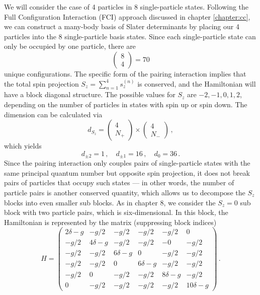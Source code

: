 {We will consider the case of 4 particles in 8 single-particle states. Following
the Full Configuration Interaction (FCI) approach discussed in chapter \ref{chapter:cc},
we can construct a many-body basis of Slater determinants by placing
our 4 particles into the 8 single-particle basis states. Since each
single-particle state can only be occupied by one particle, there are
\begin{equation}
  \begin{pmatrix} 8 \\ 4\end{pmatrix} = 70
\end{equation}
unique configurations. The specific form of the pairing interaction
implies that the total spin projection $S_z = \sum_{n=1}^4 s_z^{(n)}$ 
is conserved, and the Hamiltonian will have a block diagonal structure.
The possible values for $S_z$ are $-2,-1,0,1,2$, depending on the number
of particles in states with spin up or spin down. The dimension can be
calculated via
\begin{equation}
 d_{S_z} = \begin{pmatrix} 4 \\ N_{+}\end{pmatrix} \times 
           \begin{pmatrix} 4 \\ N_{-}\end{pmatrix}\,,
\end{equation}
which yields 
\begin{equation}
 d_{\pm 2} = 1\,, \quad d_{\pm 1} = 16\,, \quad d_{0} = 36\,.
\end{equation}
Since the pairing interaction only couples pairs of single-particle 
states with the same principal quantum number but opposite spin
projection, it does not break pairs of particles that occupy such 
states --- in other words, the number of particle pairs is another
conserved quantity, which allows us to decompose the $S_z$ blocks
into even smaller sub blocks. As in chapter 8, we consider the $S_z=0$
sub block with two particle pairs, which is six-dimensional. In this
block, the Hamiltonian is represented by the matrix (suppressing
block indices)
\begin{equation}\label{eq:def_h_matrix}
  H = \begin{pmatrix}
  2\delta -g  &      -g/2  &       -g/2 &      -g/2 &      -g/2 &        0 \\ 
         -g/2 & 4\delta -g &       -g/2 &      -g/2 &        -0 &     -g/2 \\ 
         -g/2 &       -g/2 & 6\delta -g &         0 &      -g/2 &     -g/2 \\ 
         -g/2 &       -g/2 &          0 & 6\delta-g &      -g/2 &     -g/2 \\ 
         -g/2 &          0 &       -g/2 &      -g/2 & 8\delta-g &     -g/2 \\ 
            0 &       -g/2 &       -g/2 &      -g/2 &      -g/2 & 10\delta -g
  \end{pmatrix}\,.
\end{equation}

}
